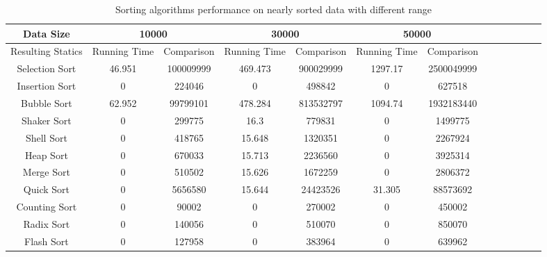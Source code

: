 \documentclass[11pt,a4paper]{article}
\begin{document}
{\begin{table}[H]
{\begin{tabular}{|c|c|c|c|c|c|c|c|c|c|c|c|c|}
		 \hline
		 Data Size & \multicolumn{2}{|c|}{10000} & \multicolumn{2}{|c|}{30000} & \multicolumn{2}{|c|}{50000} \\
		 \hline
		 Resulting Statics & Running Time & Comparison & Running Time & Comparison & Running Time & Comparison\\
		 \hline
         Selection Sort     & 46.951 & 100009999 & 469.473 & 900029999 & 1297.17 & 2500049999\\
         \hline
         Insertion Sort     & 0 & 224046 & 0 & 498842 & 0 & 627518\\
         \hline
         Bubble Sort    & 62.952 & 99799101 & 478.284 & 813532797 & 1094.74 & 1932183440\\
         \hline
         Shaker Sort    & 0 & 299775 & 16.3 & 779831 & 0 & 1499775\\
         \hline
         Shell Sort     & 0 & 418765 & 15.648 & 1320351 & 0 & 2267924\\
         \hline
         Heap Sort      & 0 & 670033 & 15.713 & 2236560 & 0 & 3925314\\
         \hline
         Merge Sort     & 0 & 510502 & 15.626 & 1672259 & 0 & 2806372\\
         \hline
         Quick Sort     & 0 & 5656580 & 15.644 & 24423526 & 31.305 & 88573692\\
         \hline
         Counting Sort  & 0 & 90002 & 0 & 270002 & 0 & 450002\\
         \hline
         Radix Sort     & 0 & 140056 & 0 & 510070 & 0 & 850070\\
         \hline
		 Flash Sort     & 0 & 127958 & 0 & 383964 & 0 & 639962\\
		 \hline
		\end{tabular}}
		\caption{Sorting algorithms performance on nearly sorted data with different range}
		\end{table}
		
}
\end{document}
